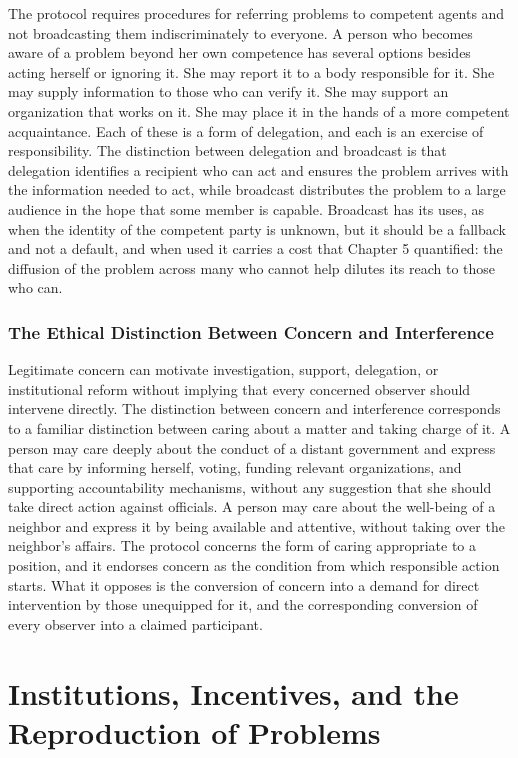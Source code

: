 \documentclass[11pt]{report}
\theoremstyle{definition}
\theoremstyle{remark}
\begin{document}
The protocol requires procedures for referring problems to competent agents and not broadcasting them indiscriminately to everyone. A person who becomes aware of a problem beyond her own competence has several options besides acting herself or ignoring it. She may report it to a body responsible for it. She may supply information to those who can verify it. She may support an organization that works on it. She may place it in the hands of a more competent acquaintance. Each of these is a form of delegation, and each is an exercise of responsibility. The distinction between delegation and broadcast is that delegation identifies a recipient who can act and ensures the problem arrives with the information needed to act, while broadcast distributes the problem to a large audience in the hope that some member is capable. Broadcast has its uses, as when the identity of the competent party is unknown, but it should be a fallback and not a default, and when used it carries a cost that Chapter 5 quantified: the diffusion of the problem across many who cannot help dilutes its reach to those who can.

\section{The Ethical Distinction Between Concern and Interference}

Legitimate concern can motivate investigation, support, delegation, or institutional reform without implying that every concerned observer should intervene directly. The distinction between concern and interference corresponds to a familiar distinction between caring about a matter and taking charge of it. A person may care deeply about the conduct of a distant government and express that care by informing herself, voting, funding relevant organizations, and supporting accountability mechanisms, without any suggestion that she should take direct action against officials. A person may care about the well-being of a neighbor and express it by being available and attentive, without taking over the neighbor's affairs. The protocol concerns the form of caring appropriate to a position, and it endorses concern as the condition from which responsible action starts. What it opposes is the conversion of concern into a demand for direct intervention by those unequipped for it, and the corresponding conversion of every observer into a claimed participant.

\part{Institutions, Incentives, and the Reproduction of Problems}
\end{document}
